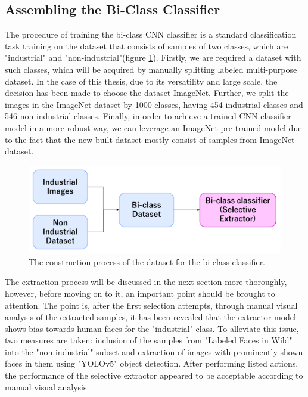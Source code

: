 \subsection{Assembling the Bi-Class Classifier}
\label{bi-class assemble}
The procedure of training the bi-class CNN classifier is a standard classification task training on the dataset that consists of samples of two classes, which are "industrial" and "non-industrial"(figure \ref{fig:cnn_train_data}). Firstly, we are required a dataset with such classes, which will be acquired by manually splitting labeled multi-purpose dataset. In the case of this thesis, due to its versatility and large scale, the decision has been made to choose the dataset ImageNet. Further, we split the images in the ImageNet dataset by 1000 classes, having 454 industrial classes and 546 non-industrial classes. Finally, in order to achieve a trained CNN classifier model in a more robust way, we can leverage an ImageNet pre-trained model due to the fact that the new built dataset mostly consist of samples from ImageNet dataset.

\begin{figure}[h]
	\begin{center}
		\includegraphics[width=1.0\linewidth]{Chapter_3/cnn_train_data.png}
	\end{center}
	\caption{The construction process of the dataset for the bi-class classifier.}
	\label{fig:cnn_train_data}
\end{figure} 	

The extraction process will be discussed in the next section more thoroughly, however, before moving on to it, an important point should be brought to attention. The point is, after the first selection attempts, through manual visual analysis of the extracted samples, it has been revealed that the extractor model shows bias towards human faces for the "industrial" class. To alleviate this issue, two measures are taken: inclusion of the samples from "Labeled Faces in Wild" into the "non-industrial" subset and extraction of images with prominently shown faces in them using "YOLOv5" object detection. After performing listed actions, the performance of the selective extractor appeared to be acceptable according to manual visual analysis.

